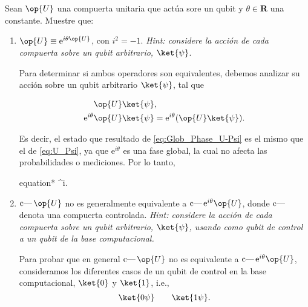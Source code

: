 \documentclass[./../main.tex]{subfiles}
\begin{document}
\section{}

Sean \(\op{U}\) una compuerta unitaria que actúa sore un qubit y \(\theta\in\bm{R}\) una constante. Muestre que:
\begin{enumerate}
	\item \(\op{U} \equiv \textrm{e}^{i\theta\op{U}}\), con \(i^{2} = -1\). \emph{Hint: considere la acción de cada compuerta sobre un qubit arbitrario, \(\ket{\psi}\)}.

	      \startsolution

	      Para determinar si ambos operadores son equivalentes, debemos analizar su acción sobre un qubit arbitrario \(\ket{\psi}\), tal que

	      \begin{align}
		      \op{U}\ket{\psi}                     & ,\label{eq:U_Psi}                                                    \\
		      \mathrm{e}^{i\theta}\op{U}\ket{\psi} & = \mathrm{e}^{i\theta}(\op{U}\ket{\psi}).\label{eq:Glob_Phase_U-Psi}
	      \end{align}

	      Es decir, el estado que resultado de \cref{eq:Glob_Phase_U-Psi} es el mismo que el de \cref{eq:U_Psi}, ya que \(\mathrm{e}^{i\theta}\) es una fase global, la cual no afecta las probabilidades o mediciones. Por lo tanto,

	      \begin{empheq}[box=\mainresult]{equation*}
		       \equiv {}^{i\theta}.
	      \end{empheq}

	      \pagebreak
	\item \(\cnot\op{U}\) no es generalmente equivalente a \(\cnot\textrm{e}^{i\theta}\op{U}\), donde \(\operatorname{c\text{---}}\) denota una compuerta controlada. \emph{Hint: considere la acción de cada compuerta sobre un qubit arbitrario, \(\ket{\psi}\), usando como qubit de control a un qubit de la base computacional.}

	      \startsolution
	      Para probar que en general \(\cnot\op{U}\) no es equivalente a \(\cnot\mathrm{e}^{i\theta}\op{U}\), consideramos los diferentes casos de un qubit de control en la base computacional, \(\ket{0}\) y \(\ket{1}\), i.e.,
	      \begin{equation*}
		      \ket{0\psi} \qquad \ket{1\psi}.
	      \end{equation*}


\end{enumerate}
\end{document}
